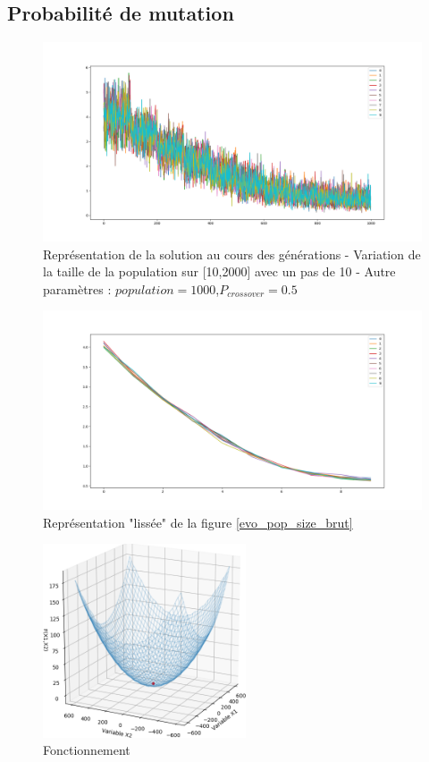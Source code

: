 \documentclass[12pt]{report}
\begin{document}
      \subsection{Probabilité de mutation}

      \begin{figure}[h]
        \centering
        \includegraphics[width=15cm]{img/evo_mutation_brut.png}
        \caption{Représentation de la solution au cours des générations - Variation de la taille de la population sur [10,2000] avec un pas de 10 - Autre paramètres : $population = 1000$,$P_{crossover} = 0.5$}
        \label{evo_mutation_brut}
      \end{figure}

      \begin{figure}[h]
        \centering
        \includegraphics[width=15cm]{img/evo_mutation_moy.png}
        \caption{Représentation "lissée" de la figure \ref{evo_pop_size_brut}}
        \label{evo_mutation_moy}
      \end{figure}


    \begin{figure}
      \centering
      \includegraphics[width=6cm]{img/3,2.png}
      \caption{Fonctionnement}
    \end{figure}
\end{document}
